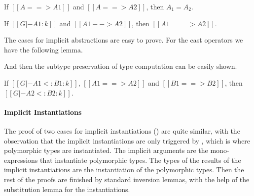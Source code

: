 \begin{lemma}
    If $[[A ==> A1]]$ and $[[A ==> A2]]$,
    then $A_1 = A_2$.
\end{lemma}

\begin{lemma}
    If $[[G |- A1 : k]]$ and $[[A1 --> A2]]$,
    then $[[A1 ==> A2]]$.
\end{lemma}

The cases for implicit abstractions are easy to prove. For the cast operators
we have the following lemma.


And then the subtype preservation of type computation can be easily shown.

\begin{lemma}
    If $[[G |- A1 <: B1 : k]]$, $[[A1 ==> A2]]$ and $[[B1 ==> B2]]$,
    then $[[G |- A2 <: B2 : k]]$.
\end{lemma}


\paragraph{Implicit Instantiations}
The proof of two cases for implicit instantiations ()
are quite similar, with the observation that the implicit
instantiations are only triggered by , which is where
polymorphic types are instantiated. The implicit arguments are the
mono-expressions that instantiate polymorphic types. The types of the results of
the implicit instantiations are the instantiation of the polymorphic types.
Then the rest of the proofs are finished by standard inversion lemmas,
with the help of the substitution lemma for the instantiations.

